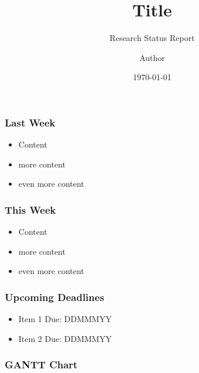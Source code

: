 \documentclass{beamer}
\title{Title}
\subtitle{Research Status Report}
\author{Author}
\institute{Missouri University of Science and Technology}
\date{\today}
\begin{document}
\frame{\titlepage}

\begin{frame}
  \frametitle{Last Week}
  \begin{itemize}
    \item Content
    \item more content
    \item even more content
  \end{itemize}
\end{frame}

\begin{frame}
  \frametitle{This Week}
  \begin{itemize}
    \item Content
    \item more content
    \item even more content
  \end{itemize}
\end{frame}

\begin{frame}
  \frametitle{Upcoming Deadlines}
  \begin{itemize}
    \item Item 1 Due: DDMMMYY
    \item Item 2 Due: DDMMMYY
  \end{itemize}
\end{frame}

\begin{frame}
  \frametitle{GANTT Chart}
\end{frame}
\end{document}
